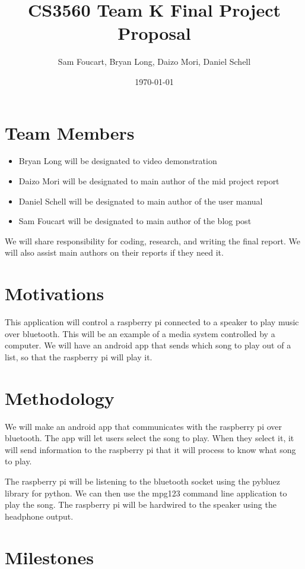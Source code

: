 \documentclass[letter]{article}
\title{CS3560 Team K Final Project Proposal}
\author{Sam Foucart, Bryan Long, Daizo Mori, Daniel Schell}
\date{\today}
\begin{document}
\maketitle

\section*{Team Members}
\begin{itemize}
	\item Bryan Long will be designated to video demonstration
	\item Daizo Mori will be designated to main author of the mid project report
	\item Daniel Schell will be designated to main author of the user manual
	\item Sam Foucart will be designated to main author of the blog post
\end{itemize}

We will share responsibility for coding, research, and writing the final report. We will also assist main authors on their reports if they need it.

\section*{Motivations}

This application will control a raspberry pi connected to a speaker to play music over bluetooth. This will be an example of a media system controlled by a computer. We will have an android app that sends which song to play out of a list, so that the raspberry pi will play it.

\section*{Methodology}

We will make an android app that communicates with the raspberry pi over bluetooth. The app will let users select the song to play. When they select it, it will send information to the raspberry pi that it will process to know what song to play.

The raspberry pi will be listening to the bluetooth socket using the pybluez library for python. We can then use the mpg123 command line application to play the song. The raspberry pi will be hardwired to the speaker using the headphone output.

\section*{Milestones}
\end{document}
